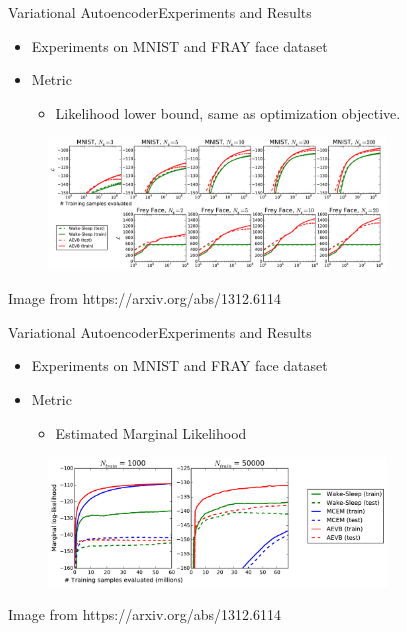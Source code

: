 \documentclass{beamer}
\begin{document}
\begin{frame}{Variational Autoencoder}{Experiments and Results}
    \begin{itemize}
        \item {
            Experiments on MNIST and FRAY face dataset
        }
        \item {
            Metric
            \begin{itemize}
                \item{
                    Likelihood lower bound, same as optimization objective.
                }
            \end{itemize}
        }
    \end{itemize}
    \begin{figure}
        \centering
        \includegraphics[width=0.8\textwidth]{graph_lowbound}
    \end{figure}
    {\small Image from https://arxiv.org/abs/1312.6114}
\end{frame}

\begin{frame}{Variational Autoencoder}{Experiments and Results}
    \begin{itemize}
        \item {
            Experiments on MNIST and FRAY face dataset
        }
        \item {
            Metric
            \begin{itemize}
                \item{
                    Estimated Marginal Likelihood
                }
            \end{itemize}
        }
    \end{itemize}
    \begin{figure}
        \centering
        \includegraphics[width=0.8\textwidth]{graph_marglik}
    \end{figure}
    {\small Image from https://arxiv.org/abs/1312.6114}
\end{frame}
\end{document}
